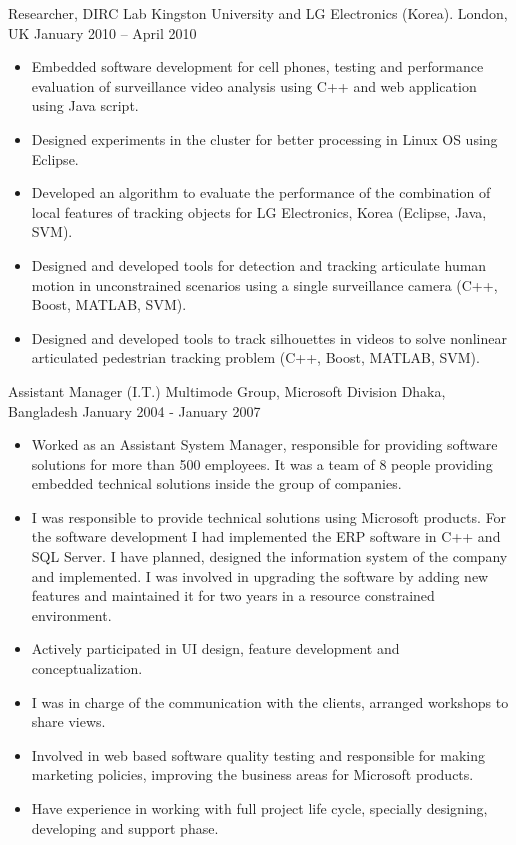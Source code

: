 \begin{cventries}
  \cventry
    {Researcher, DIRC Lab}
    {Kingston University and LG Electronics (Korea). }
    {London, UK}
    {January 2010 – April 2010}
    {
    \begin{itemize}
    	\item
		Embedded software development for cell phones, testing and performance evaluation of surveillance video analysis using C++ and web application using Java script.
		\item
		Designed experiments in the cluster for better processing in Linux OS using Eclipse.
		\item
		Developed an algorithm to evaluate the performance of the combination of local features of tracking objects for LG Electronics, Korea (Eclipse, Java, SVM).
		\item
		Designed and developed tools for detection and tracking articulate human motion in unconstrained scenarios using a single surveillance camera (C++, Boost, MATLAB, SVM).
		\item
		Designed and developed tools to track silhouettes in videos to solve nonlinear articulated pedestrian tracking problem (C++, Boost, MATLAB, SVM).		
	\end{itemize}
    }

  \cventry
  {Assistant Manager (I.T.)}
  {Multimode Group, Microsoft Division }
  {Dhaka, Bangladesh}
  {January 2004 - January 2007}
  {
	\begin{itemize}
		\item
		Worked as an Assistant System Manager, responsible for providing software solutions for more than 500 employees. It was a team of 8 people providing embedded technical solutions inside the group of companies.
		\item
		I was responsible to provide technical solutions using Microsoft products. For the software development I had implemented the ERP software in C++ and SQL Server. I have planned, designed the information system of the company and implemented. I was involved in upgrading the software by adding new features and maintained it for two years in a resource constrained environment.
		\item
		Actively participated in UI design, feature development and conceptualization.
		\item
		I was in charge of the communication with the clients, arranged workshops to share views.
		\item
		Involved in web based software quality testing and responsible for making marketing policies, improving the business areas for Microsoft products.
		\item
		Have experience in working with full project life cycle, specially designing, developing and support phase.		
	\end{itemize}
  }
\end{cventries}
